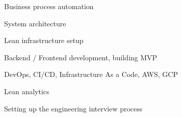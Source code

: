 \item Business process automation
\item System architecture
\item Lean infrastructure setup
\item Backend / Frontend development, building MVP
\item DevOps, CI/CD, Infrastructure As a Code, AWS, GCP
\item Lean analytics
\item Setting up the engineering interview process
